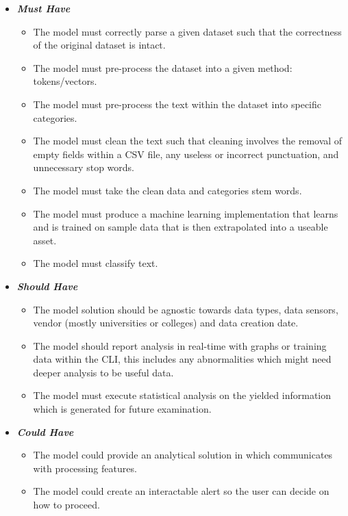 \begin{itemize}
    \item \textbf{\textit{Must Have}}
        \begin{itemize}\label{FMH}
            \item The model must correctly parse a given dataset such that the correctness of the original dataset is intact.
            \item The model must pre-process the dataset into a given method: tokens/vectors.
            \item The model must pre-process the text within the dataset into specific categories.
            \item The model must clean the text such that cleaning involves the removal of empty fields within a CSV file, any useless or incorrect punctuation, and unnecessary stop words.
            \item The model must take the clean data and categories stem words.
            \item The model must produce a machine learning implementation that learns and is trained on sample data that is then extrapolated into a useable asset.
            \item The model must classify text.
        \end{itemize}
    \item \textbf{\textit{Should Have}}
        \begin{itemize}\label{FSH}
            \item The model solution should be agnostic towards data types, data sensors, vendor (mostly universities or colleges) and data creation date.
            \item The model should report analysis in real-time with graphs or training data within the CLI, this includes any abnormalities which might need deeper analysis to be useful data.
            \item The model must execute statistical analysis on the yielded information which is generated for future examination.
        \end{itemize}
    \item \textbf{\textit{Could Have}}
        \begin{itemize}\label{FCH}
            \item The model could provide an analytical solution in which communicates with processing features.
            \item The model could create an interactable alert so the user can decide on how to proceed.

\end{itemize}
\end{itemize}
